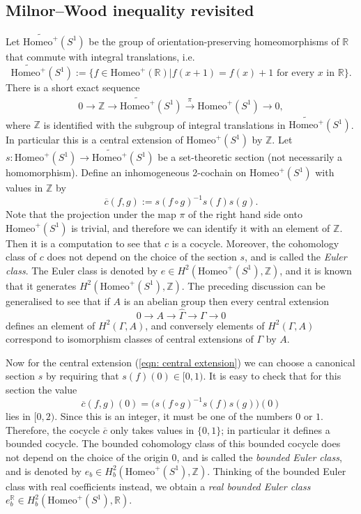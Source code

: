 \documentclass[11pt]{amsart}
\theoremstyle{remark}
\theoremstyle{definition}
\begin{document}
	\subsection{Milnor--Wood inequality revisited}
	Let $\widetilde{\mathrm{Homeo}^+}(S^1)$ be the group of orientation-preserving homeomorphisms of $\mathbb{R}$ that commute with integral translations, i.e.
		\[ \widetilde{\mathrm{Homeo}^+}(S^1) := \{ f \in \mathrm{Homeo}^+(\mathbb{R}) | f (x+1) = f(x)+1 \text{ for every } x \text{ in } \mathbb{R}\}. \]
		There is a short exact sequence 
		\begin{eqnarray}
				0 \rightarrow \mathbb{Z} \rightarrow \widetilde{\mathrm{Homeo}^+}(S^1) \xrightarrow{\pi} \mathrm{Homeo}^+(S^1) \rightarrow 0, 
				\label{eqn: central extension}
			\end{eqnarray} 
		where $\mathbb{Z}$ is identified with the subgroup of integral translations in $\widetilde{\mathrm{Homeo}^+}(S^1)$. In particular this is a central extension of $\mathrm{Homeo}^+(S^1)$ by $\mathbb{Z}$.
	Let $s \colon \mathrm{Homeo}^+(S^1) \rightarrow  \widetilde{\mathrm{Homeo}^+}(S^1)$ be a set-theoretic section (not necessarily a homomorphism). Define an inhomogeneous 2-cochain on $\mathrm{Homeo}^+(S^1)$ with values in $\mathbb{Z}$ by 
	\[ \overline{c}(f, g) := s(f \circ g)^{-1} s(f) s(g).  \]
	Note that the projection under the map $\pi$ of the right hand side onto $\mathrm{Homeo}^+(S^1)$ is trivial, and therefore we can identify it with an element of $\mathbb{Z}$. Then it is a computation to see that $c$ is a cocycle. Moreover, the cohomology class of $c$ does not depend on the choice of the section $s$, and is called the \emph{Euler class}. The Euler class is denoted by $e \in H^2(\mathrm{Homeo}^+(S^1) , \mathbb{Z})$, and it is known that it generates $H^2(\mathrm{Homeo}^+(S^1) , \mathbb{Z})$.  The preceding discussion can be generalised to see that if $A$ is an abelian group then every central extension 
	\[ 0 \rightarrow A \rightarrow \hat{\Gamma} \rightarrow \Gamma \rightarrow 0 \]
	defines an element of $H^2(\Gamma , A)$, and conversely elements of $H^2(\Gamma , A)$ correspond to isomorphism classes of central extensions of $\Gamma$ by $A$. 
	
	Now for the central extension (\ref{eqn: central extension}) we can choose a canonical section $s$ by requiring that $s(f)(0) \in [0 , 1)$. It is easy to check that for this section the value
	\[ \overline{c}(f, g)(0) =  \big(s(f \circ g)^{-1} s(f) s(g) \big) (0)\]
	lies in $[0, 2)$. Since this is an integer, it must be one of the numbers $0$ or $1$. Therefore, the cocycle $\overline{c}$ only takes values in $\{ 0, 1\}$; in particular it defines a bounded cocycle. The bounded cohomology class of this bounded cocycle does not depend on the choice of the origin $0$, and is called the \emph{bounded Euler class}, and is denoted by $e_b \in H^2_b(\mathrm{Homeo}^+(S^1) , \mathbb{Z})$. Thinking of the bounded Euler class with real coefficients instead, we obtain a \emph{real bounded Euler class} $e_b^\mathbb{R} \in H^2_b(\mathrm{Homeo}^+(S^1) , \mathbb{R})$. 
	
\end{document}
